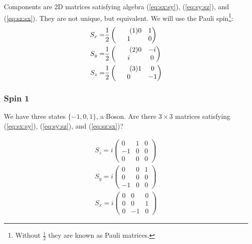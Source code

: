 \documentclass[]{article}
\newcommand\numberthis{\addtocounter{equation}{1}\tag{\theequation}}
\begin{document}
Components are 2D matrices satisfying algebra (\ref{eq:sx:sy}), (\ref{eq:sy:sz}), and (\ref{eq:sz:sx}). They are not unique, but equivalent. We will use the Pauli spin\footnote{Without $\frac{1}{2}$ they are known as Pauli matrices.}:
\begin{align*}
	S_x =& \frac{1}{2}\begin{pmatrix} \numberthis \label{eq:pauli:x}
		0&1\\
		1&0
	\end{pmatrix}\\
	S_y =& \frac{1}{2}\begin{pmatrix} \numberthis \label{eq:pauli:y}
		0&-i\\
		i&0
	\end{pmatrix}\\
	S_z =& \frac{1}{2}\begin{pmatrix} \numberthis \label{eq:pauli:z}
		1&0\\
		0&-1
	\end{pmatrix}
\end{align*}

\subsubsection{Spin 1}

We have three states $\{-1,0,1\}$, a Boson. Are there $3\times3$ matrices satisfying (\ref{eq:sx:sy}), (\ref{eq:sy:sz}), and (\ref{eq:sz:sx})?

\begin{align*}
	S_z = i \begin{pmatrix}
		0&1&0\\
		-1&0&0\\
		0&0&0
	\end{pmatrix}\\
	S_y = i \begin{pmatrix}
		0&0&1\\
		0&0&0\\
		-1&0&0
	\end{pmatrix}\\
	S_x = i \begin{pmatrix}
		0&0&0\\
		0&0&1\\
		0&-1&0
	\end{pmatrix}
\end{align*}
\end{document}
